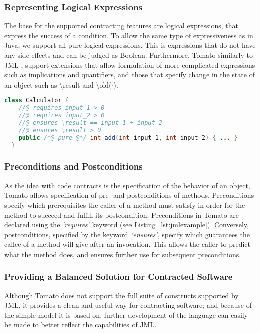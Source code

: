 \subsubsection{Representing Logical Expressions}
\label{sub:Representing Logical Expressions}
The base for the supported contracting features are logical expressions, that express
the success of a condition.
To allow the same type of expressiveness as in Java, we support all pure
logical expressions. This is expressions that do not have any side effects and can be judged as Boolean.
Furthermore, Tomato similarly to JML \cite{leavens2006design},
support extensions that allow formulation of more complicated
expressions such as implications and quantifiers,
and those that specify change in the state of an object such as \textbackslash result
and \textbackslash old($\cdot$).

\begin{lstlisting}[language=Java,caption={Contracted Method for Adding Natural Numbers},label={lst:jmlexample}]
  class Calculator {
    //@ requires input_1 > 0
    //@ requires input_2 > 0
    //@ ensures \result == input_1 + input_2
    //@ ensures \result > 0
    public /*@ pure @*/ int add(int input_1, int input_2) { ... }
  }
\end{lstlisting}

\subsubsection{Preconditions and Postconditions}
\label{sub:Preconditions and Postconditions}

As the idea with code contracts is the specification of the behavior of
an object, Tomato allows specification of pre- and postconditions of methods.
Preconditions specify which prerequisites the caller of a method must
satisfy in order for the method to succeed and fulfill its postcondition.
Preconditions in Tomato are declared using the \emph{`requires'}
keyword (see Listing~\ref{lst:jmlexample}).
Conversely, postconditions, specified by the keyword \emph{`ensures'},
specify which guarantees the callee of a method will give after an invocation.
This allows the caller to predict what the method does,
and ensures further use for subsequent preconditions.

\subsubsection{Providing a Balanced Solution for Contracted Software}
\label{ssub:ProvidingaBalancedSolutionforContractedSoftware}
Although Tomato does not support the full suite of constructs supported by JML, it provides a clean and useful way for contracting software; and because of 
the simple model it is based on, further development of the language can easily be made to better reflect the capabilities of JML.
